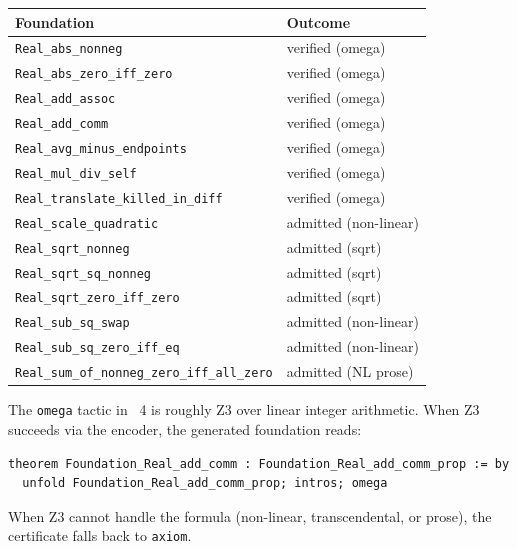 \begin{center}
\begin{tabular}{ll}
\toprule
\textbf{Foundation} & \textbf{Outcome} \\
\midrule
\texttt{Real\_abs\_nonneg}                       & verified (omega) \\
\texttt{Real\_abs\_zero\_iff\_zero}              & verified (omega) \\
\texttt{Real\_add\_assoc}                         & verified (omega) \\
\texttt{Real\_add\_comm}                          & verified (omega) \\
\texttt{Real\_avg\_minus\_endpoints}              & verified (omega) \\
\texttt{Real\_mul\_div\_self}                     & verified (omega) \\
\texttt{Real\_translate\_killed\_in\_diff}        & verified (omega) \\
\texttt{Real\_scale\_quadratic}                   & admitted (non-linear) \\
\texttt{Real\_sqrt\_nonneg}                       & admitted (sqrt) \\
\texttt{Real\_sqrt\_sq\_nonneg}                   & admitted (sqrt) \\
\texttt{Real\_sqrt\_zero\_iff\_zero}              & admitted (sqrt) \\
\texttt{Real\_sub\_sq\_swap}                      & admitted (non-linear) \\
\texttt{Real\_sub\_sq\_zero\_iff\_eq}             & admitted (non-linear) \\
\texttt{Real\_sum\_of\_nonneg\_zero\_iff\_all\_zero} & admitted (NL prose) \\
\bottomrule
\end{tabular}
\end{center}

The \texttt{omega} tactic in \Lean{}~4 is roughly Z3 over linear
integer arithmetic.  When Z3 succeeds via the encoder, the
generated \Lean{} foundation reads:

\begin{lstlisting}[language=lean4]
theorem Foundation_Real_add_comm : Foundation_Real_add_comm_prop := by
  unfold Foundation_Real_add_comm_prop; intros; omega
\end{lstlisting}

When Z3 cannot handle the formula (non-linear, transcendental, or
prose), the certificate falls back to \texttt{axiom}.

